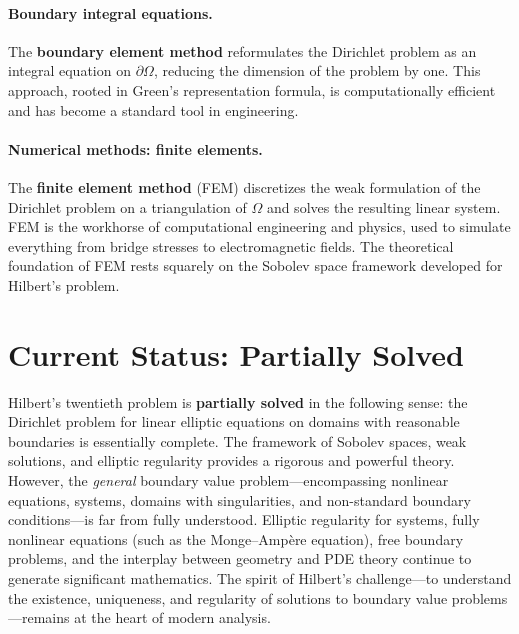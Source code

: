 \paragraph{Boundary integral equations.}
The \textbf{boundary element method} reformulates the Dirichlet problem as an integral equation on $\partial\Omega$, reducing the dimension of the problem by one. This approach, rooted in Green's representation formula, is computationally efficient and has become a standard tool in engineering.

\paragraph{Numerical methods: finite elements.}
The \textbf{finite element method} (FEM) discretizes the weak formulation of the Dirichlet problem on a triangulation of $\Omega$ and solves the resulting linear system. FEM is the workhorse of computational engineering and physics, used to simulate everything from bridge stresses to electromagnetic fields. The theoretical foundation of FEM rests squarely on the Sobolev space framework developed for Hilbert's problem.

\section{Current Status: Partially Solved}

\begin{partiallybox}
Hilbert's twentieth problem is \textbf{partially solved} in the following sense: the Dirichlet problem for linear elliptic equations on domains with reasonable boundaries is essentially complete. The framework of Sobolev spaces, weak solutions, and elliptic regularity provides a rigorous and powerful theory. However, the \emph{general} boundary value problem---encompassing nonlinear equations, systems, domains with singularities, and non-standard boundary conditions---is far from fully understood. Elliptic regularity for systems, fully nonlinear equations (such as the Monge--Amp\`ere equation), free boundary problems, and the interplay between geometry and PDE theory continue to generate significant mathematics. The spirit of Hilbert's challenge---to understand the existence, uniqueness, and regularity of solutions to boundary value problems---remains at the heart of modern analysis.
\end{partiallybox}

